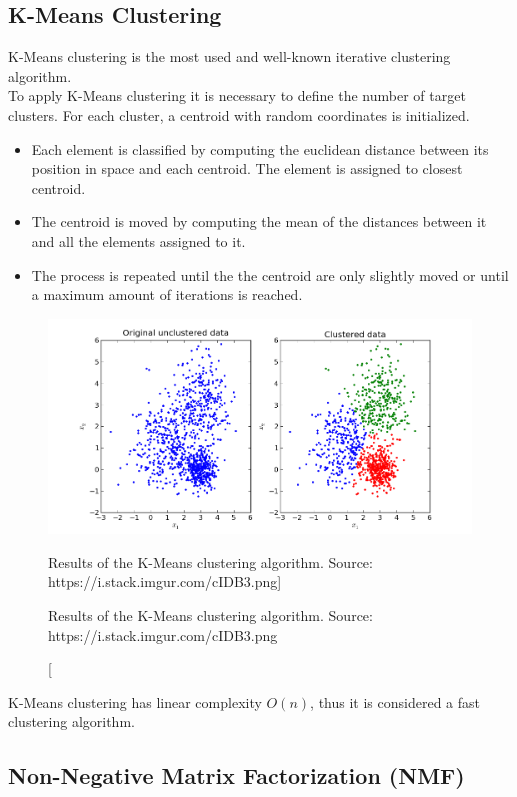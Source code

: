 \subsection{K-Means Clustering}

K-Means clustering is the most used and well-known iterative clustering algorithm.\\
To apply K-Means clustering it is necessary to define the number of target clusters. For each cluster, a centroid with random coordinates is initialized.
\begin{itemize}
\item Each element is classified by computing the euclidean distance between its position in space and each centroid. The element is assigned to closest centroid.
\item The centroid is moved by computing the mean of the distances between it and all the elements assigned to it.
\item The process is repeated until the the centroid are only slightly moved or until a maximum amount of iterations is reached.
\end{itemize}
\begin{figure}[htb]
  \centering
  \includegraphics[width=\textwidth]{pictures/k-means-clustering}
  \caption
  [Results of the K-Means clustering algorithm. Source: https://i.stack.imgur.com/cIDB3.png]
  {\protect\raggedright Results of the K-Means clustering algorithm. Source: https://i.stack.imgur.com/cIDB3.png}
\end{figure}
K-Means clustering has linear complexity $O(n)$, thus it is considered a fast clustering algorithm.


\subsection{Non-Negative Matrix Factorization (NMF)}

